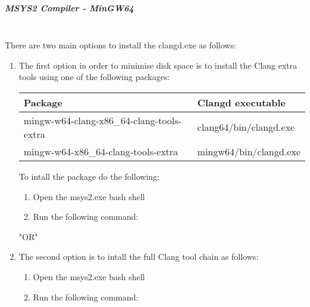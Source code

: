    \subparagraph*{MSYS2 Compiler - MinGW64} \hspace{0pt} \\
   There are two main options to install the clangd.exe as follows:
   \begin{enumerate}[noitemsep]
   \item The first option in order to  minimise disk space is to install the Clang extra tools using one of the following packages:       
        {\footnotesize
        \begin{longtable}{|l|l|}\hline
        \textbf{Package}                            & \textbf{Clangd executable}    \\ \hline
        mingw-w64-clang-x86\_64-clang-tools-extra   & clang64/bin/clangd.exe        \\
        mingw-w64-x86\_64-clang-tools-extra         & mingw64/bin/clangd.exe        \\ \hline
        \end{longtable}
        \par}
 
        To intall the package do the following:
        \begin{enumerate}[noitemsep]
        \item Open the msys2.exe bash shell 
        \item Run the following command: \newline
               \newline
        \end{enumerate}

       "OR" \newline

    \item The second option is to intall the full Clang tool chain as follows:
        \begin{enumerate}[noitemsep]
        \item Open the msys2.exe bash shell 
        \item Run the following command:
        \end{enumerate}
    \end{enumerate}

